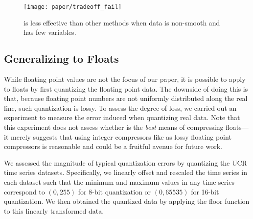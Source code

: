 


\begin{figure}[h]
\begin{center}
    \texttt{[image: paper/tradeoff\_fail]}
    \caption{\minesp is less effective than other methods when data is non-smooth and has few variables.}
    \label{fig:tradeoff_failure}
\end{center}
\end{figure}

\subsection{Generalizing to Floats}


While floating point values are not the focus of our paper, it is possible to apply \minesp to floats by first quantizing the floating point data. The downside of doing this is that, because floating point numbers are not uniformly distributed along the real line, such quantization is lossy. To assess the degree of loss, we carried out an experiment to measure the error induced when quantizing real data. Note that this experiment does not assess whether \minesp is the \textit{best} means of compressing floats---it merely suggests that using integer compressors like \minesp as lossy floating point compressors is reasonable and could be a fruitful avenue for future work. %

We assessed the magnitude of typical quantization errors by quantizing the UCR time series datasets. Specifically, we linearly offset and rescaled the time series in each dataset such that the minimum and maximum values in any time series correspond to $(0, 255)$ for 8-bit quantization or $(0, 65535)$ for 16-bit quantization. We then obtained the quantized data by applying the floor function to this linearly transformed data.

